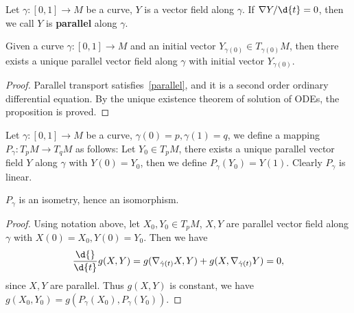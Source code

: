 \begin{defn}
    Let $\gamma:[0,1]\to M$ be a curve, $Y$ is a vector field along $\gamma$.
    If $\nabla Y/\d{t}=0$, then we call $Y$ is \textbf{parallel} along $\gamma$.
\end{defn}

\begin{prop}\label{parallel transport!existence}
    Given a curve $\gamma:[0,1]\to M$ and an initial vector $Y_{\gamma(0)}\in T_{\gamma(0)}M$, then there exists a unique parallel vector field along $\gamma$ with initial vector $Y_{\gamma(0)}$.
\end{prop}
\begin{proof}
    Parallel transport satisfies~\eqref{parallel}, and it is a second order ordinary differential equation.
    By the unique existence theorem of solution of ODEs, the proposition is proved.
\end{proof}

\begin{defn}
    Let $\gamma:[0,1]\to M$ be a curve, $\gamma(0)=p,\gamma(1)=q$, we define a mapping $P_\gamma:T_pM\to T_qM$ as follows:
    Let $Y_0\in T_pM$, there exists a unique parallel vector field $Y$ along $\gamma$ with $Y(0)=Y_0$, then we define $P_\gamma(Y_0)=Y(1)$.
    Clearly $P_\gamma$ is linear.
\end{defn}

\begin{prop}
    $P_\gamma$ is an isometry, hence an isomorphism.
\end{prop}
\begin{proof}
    Using notation above, let $X_0,Y_0\in T_pM$, $X,Y$ are parallel vector field along $\gamma$ with $X(0)=X_0,Y(0)=Y_0$.
    Then we have
    \[\frac{\d{}}{\d{t}}g(X,Y)=g(\nabla_{\dot{\gamma}(t)}X,Y)+g(X,\nabla_{\dot{\gamma}(t)}Y)=0,\]
    since $X,Y$ are parallel.
    Thus $g(X,Y)$ is constant, we have $g(X_0,Y_0)=g(P_\gamma(X_0),P_\gamma(Y_0))$.
\end{proof}

